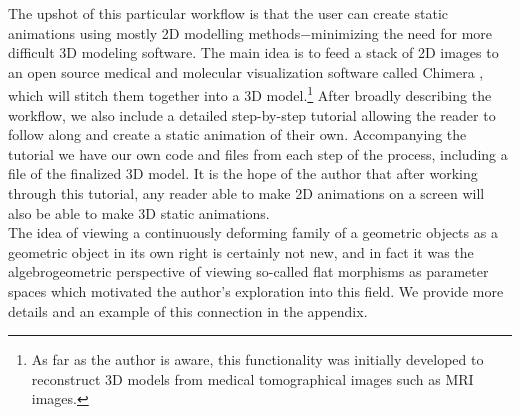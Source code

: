 \documentclass[12 pt]{article}
\begin{document}
The upshot of this particular workflow is that the user can create static animations using mostly 2D modelling methods$-$minimizing the need for more difficult 3D modeling software.  The main idea is to feed a stack of 2D images to an open source medical and molecular visualization software called Chimera \cite{chimera},\cite{chimeraSoftware} which will stitch them together into a 3D model.\footnote{As far as the author is aware, this functionality was initially developed to reconstruct 3D models from medical tomographical images such as MRI images.}  After broadly describing the workflow, we also include a detailed step-by-step tutorial allowing the reader to follow along and create a static animation of their own.  Accompanying the tutorial we have our own code and files from each step of the process, including a file of the finalized 3D model.  It is the hope of the author that after working through this tutorial, any reader able to make 2D animations on a screen will also be able to make 3D static animations.\\

The idea of viewing a continuously deforming family of a geometric objects as a geometric object in its own right is certainly not new, and in fact it was the algebrogeometric perspective of viewing so-called flat morphisms as parameter spaces which motivated the author's exploration into this field.  We provide more details and an example of this connection in the appendix.
\end{document}
